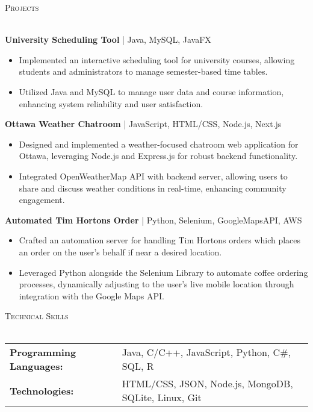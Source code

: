 \documentclass[a4paper]{article}
\newcommand{\lineunder} {
    \vspace*{-8pt} \\
    \hspace*{-18pt} \hrulefill \\
}
\newcommand{\header} [1] {
    {\hspace*{-18pt}\vspace*{6pt} \textsc{#1}}
    \vspace*{-6pt} \lineunder
}
\begin{document}
\header{Projects}
\vspace{1mm}

{\textbf{University Scheduling Tool} | Java, MySQL, JavaFX}\\
\vspace{-1mm}
\begin{itemize} \itemsep 1pt
    \item Implemented an interactive scheduling tool for university courses, allowing students and administrators to manage semester-based time tables.
    \item Utilized Java and MySQL to manage user data and course information, enhancing system reliability and user satisfaction.
\end{itemize}
\vspace*{2mm}

{\textbf{Ottawa Weather Chatroom} | JavaScript, HTML/CSS, Node.js, Next.js}\\
\vspace{-1mm}
\begin{itemize} \itemsep 1pt
    \item Designed and implemented a weather-focused chatroom web application for Ottawa, leveraging Node.js and Express.js for robust backend functionality.
    \item Integrated OpenWeatherMap API with backend server, allowing users to share and discuss weather conditions in real-time, enhancing community engagement.
\end{itemize}
\vspace*{2mm}

{\textbf{Automated Tim Hortons Order} | Python, Selenium, GoogleMapsAPI, AWS}\\
\vspace{-1mm}
\begin{itemize} \itemsep 1pt
    \item Crafted an automation server for handling Tim Hortons orders which places an order on the user's behalf if near a desired location.
    \item Leveraged Python alongside the Selenium Library to automate coffee ordering processes, dynamically adjusting to the user's live mobile location through integration with the Google Maps API.
\end{itemize}
\vspace*{2mm}

\header{Technical Skills}
\begin{tabular}{ l l }
    \textbf{Programming Languages:} & Java, C/C++, JavaScript, Python, C\#, SQL, R         \\
    \textbf{Technologies: }         & HTML/CSS, JSON, Node.js, MongoDB, SQLite, Linux, Git \\
\end{tabular}
\vspace{2mm}
\end{document}
